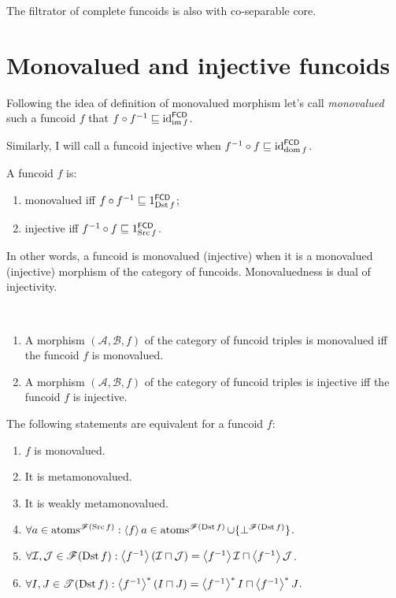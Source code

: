 \begin{cor}
The filtrator of complete funcoids is also with co-separable core.
\end{cor}

\section{Monovalued and injective funcoids}

Following the
idea of definition of monovalued morphism let's call \emph{monovalued}
such a funcoid $f$ that $f\circ f^{-1}\sqsubseteq\operatorname{id}_{\operatorname{im} f}^{\mathsf{FCD}}$.

Similarly, I will
call a funcoid injective when $f^{-1}\circ f\sqsubseteq\operatorname{id}_{\operatorname{dom}
f}^{\mathsf{FCD}}$.
\begin{obvious}
A funcoid $f$ is:
\begin{enumerate}
\item monovalued iff $f\circ f^{-1}\sqsubseteq1_{\operatorname{Dst} f}^{\mathsf{FCD}}$;
\item injective iff $f^{-1}\circ f\sqsubseteq1_{\operatorname{Src} f}^{\mathsf{FCD}}$.
\end{enumerate}
\end{obvious}
In other words, a funcoid is monovalued (injective) when it is a monovalued
(injective) morphism of the category of funcoids. Monovaluedness is
dual of injectivity.
\begin{obvious}
~
\begin{enumerate}
\item A morphism $(\mathcal{A},\mathcal{B},f)$ of the category of funcoid
triples is monovalued iff the funcoid $f$ is monovalued.
\item A morphism $(\mathcal{A},\mathcal{B},f)$ of the category of funcoid
triples is injective iff the funcoid $f$ is injective.
\end{enumerate}
\end{obvious}
\begin{thm}
The following statements are equivalent for a funcoid $f$:
\begin{enumerate}
\item \label{fcd-mv}$f$ is monovalued.
\item \label{fcd-mmv}It is metamonovalued.
\item \label{fcd-wmmv}It is weakly metamonovalued.
\item \label{mnv-atom}$\forall a\in\operatorname{atoms}^{\mathscr{F}(\operatorname{Src} f)}:\left\langle f\right\rangle a\in\operatorname{atoms}^{\mathscr{F}(\operatorname{Dst} f)}\cup\{\bot^{\mathscr{F}(\operatorname{Dst} f)}\}$.
\item \label{mnv-flt}$\forall\mathcal{I},\mathcal{J}\in\mathscr{F}(\operatorname{Dst}
f):\left\langle f^{-1}\right\rangle(\mathcal{I}\sqcap\mathcal{J})=\left\langle f^{-1}\right\rangle\mathcal{I}
\sqcap\left\langle f^{-1}\right\rangle\mathcal{J}$.
\item \label{mnv-set}$\forall I,J\in\mathscr{T}(\operatorname{Dst} f):\left\langle f^{-1}\right\rangle ^{\ast}(I\sqcap
J)=\left\langle f^{-1}\right\rangle ^{\ast}I\sqcap\left\langle f^{-1}\right\rangle ^{\ast}J$.
\end{enumerate}
\end{thm}
